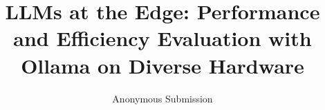 \documentclass[conference]{IEEEtran}
\begin{document}
\title{
LLMs at the Edge: Performance and Efficiency Evaluation with Ollama on Diverse Hardware
}

\author{Anonymous Submission}

\maketitle
\end{document}
